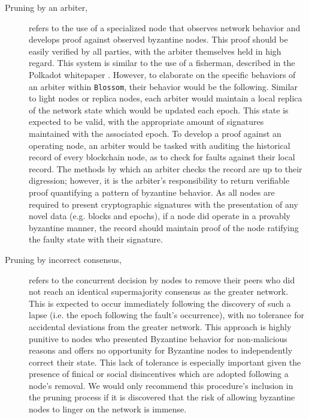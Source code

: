 \begin{description}
\item[Pruning by an arbiter,] refers to the use of a specialized node that observes network behavior and develops proof against observed byzantine nodes. This proof should be easily verified by all parties, with the arbiter themselves held in high regard. This system is similar to the use of a fisherman, described in the Polkadot whitepaper \cite{polkadot-pl}. However, to elaborate on the specific behaviors of an arbiter within \texttt{Blossom}, their behavior would be the following. Similar to light nodes or replica nodes, each arbiter would maintain a local replica of the network state which would be updated each epoch. This state is expected to be valid, with the appropriate amount of signatures maintained with the associated epoch. To develop a proof against an operating node, an arbiter would be tasked with auditing the historical record of every blockchain node, as to check for faults against their local record. The methods by which an arbiter checks the record are up to their digression; however, it is the arbiter’s responsibility to return verifiable proof quantifying a pattern of byzantine behavior. As all nodes are required to present cryptographic signatures with the presentation of any novel data (e.g. blocks and epochs), if a node did operate in a provably byzantine manner, the record should maintain proof of the node ratifying the faulty state with their signature.
\item[Pruning by incorrect consensus,] refers to the concurrent decision by nodes to remove their peers who did not reach an identical supermajority consensus as the greater network. This is expected to occur immediately following the discovery of such a lapse (i.e. the epoch following the fault’s occurrence), with no tolerance for accidental deviations from the greater network. This approach is highly punitive to nodes who presented Byzantine behavior for non-malicious reasons and offers no opportunity for Byzantine nodes to independently correct their state. This lack of tolerance is especially important given the presence of finical or social disincentives which are adopted following a node's removal. We would only recommend this procedure's inclusion in the pruning process if it is discovered that the risk of allowing byzantine nodes to linger on the network is immense.

\end{description}
